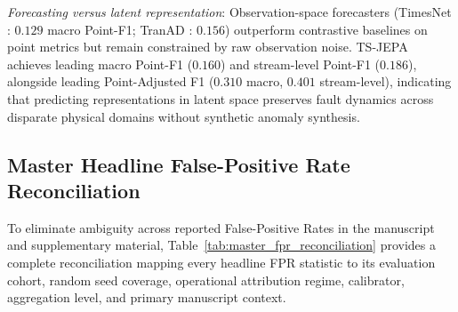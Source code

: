\emph{Forecasting versus latent representation}: Observation-space forecasters (TimesNet \cite{wu2023timesnet}: $0.129$ macro Point-F1; TranAD \cite{tuli2022tranad}: $0.156$) outperform contrastive baselines on point metrics but remain constrained by raw observation noise. TS-JEPA achieves leading macro Point-F1 ($0.160$) and stream-level Point-F1 ($0.186$), alongside leading Point-Adjusted F1 ($0.310$ macro, $0.401$ stream-level), indicating that predicting representations in latent space preserves fault dynamics across disparate physical domains without synthetic anomaly synthesis.

\subsection{Master Headline False-Positive Rate Reconciliation}
\label{subsec:master_fpr_reconciliation}

To eliminate ambiguity across reported False-Positive Rates in the manuscript and supplementary material, Table~\ref{tab:master_fpr_reconciliation} provides a complete reconciliation mapping every headline FPR statistic to its evaluation cohort, random seed coverage, operational attribution regime, calibrator, aggregation level, and primary manuscript context.

